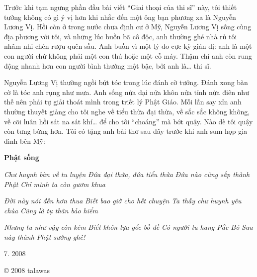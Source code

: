 \documentclass[../main.tex]{subfiles}
\begin{document}
\begin{multicols}{2}
\begin{blockquote}
\end{blockquote}
 
Trước khi tạm ngưng phần đầu bài viết “Giai thoại của thi sĩ” này, tôi thiết tưởng không có gì ý vị hơn khi nhắc đến một ông bạn phương xa là Nguyễn Lương Vị. Hồi còn ở trong nước chưa định cư ở Mỹ, Nguyễn Lương Vị sống cùng địa phương với tôi, và những lúc buồn bã cô độc, anh thường ghé nhà rủ tôi nhâm nhi chén rượu quên sầu. Anh buồn vì một lý do cực kỳ giản dị: anh là một con người chứ không phải một con thú hoặc một cỗ máy. Thậm chí anh còn rung động nhanh hơn con người bình thường một bậc, bởi anh là… thi sĩ. 
 
Nguyễn Lương Vị thường ngồi bứt tóc trong lúc đánh cờ tướng. Ðánh xong bàn cờ là tóc anh rụng như mưa. Anh sống nửa dại nửa khôn nửa tỉnh nửa điên như thế nên phải tự giải thoát mình trong triết lý Phật Giáo. Mỗi lần say xỉn anh thường thuyết giảng cho tôi nghe về tiểu thừa đại thừa, về sắc sắc không không, về cõi luân hồi sát na sát khí… để cho tôi “choáng” mà bớt quậy. Nào dè tôi quậy còn tưng bừng hơn. Tôi có tặng anh bài thơ sau đây trước khi anh sum họp gia đình bên Mỹ: 
\begin{blockquote}
 
\textbf{Phật sống} 
        
\textit{Chư huynh bàn về tu luyện}        
\textit{Ðứa đại thừa, đứa tiểu thừa}        
\textit{Ðứa nào cũng sắp thành Phật} 
\textit{Chỉ mình ta còn gươm khua} 
        
\textit{Ðời này nói đến hơn thua}        
\textit{Biết bao giờ cho hết chuyện}        
\textit{Ta thấy chư huynh yêu chùa} 
\textit{Cũng là tự thân bảo hiểm} 
        
\textit{Nhưng tu như vậy còn kém}        
\textit{Biết khôn lựa gốc bồ đề}        
\textit{Có người tu hang Pắc Bó} 
\textit{Sau này thành Phật sướng ghê!} 

\end{blockquote}
 
7. 2008 
 
© 2008 talawas 
\end{multicols}
\end{document}

